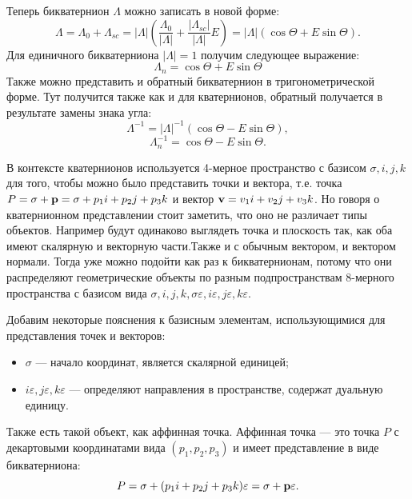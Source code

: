 Теперь бикватернион $\Lambda$ можно записать в новой форме:
\begin{equation*}
    \Lambda = \Lambda_0 + \Lambda_{sc} = |\Lambda| \left( \frac{\Lambda_0}{|\Lambda|} + \frac{|\Lambda_{sc}|}{|\Lambda|} E \right) = |\Lambda| (\cos\Theta + E \sin\Theta).
\end{equation*}
Для единичного бикватерниона $|\Lambda| = 1$ получим следующее выражение:
\begin{equation*}
    \Lambda_n = \cos\Theta + E \sin\Theta
\end{equation*}
Также можно представить и обратный бикватернион в тригонометрической форме. Тут получится также как и для кватернионов, обратный получается в результате замены знака угла:
\begin{equation*}
    \Lambda^{-1} = |\Lambda|^{-1} (\cos\Theta - E \sin\Theta),
\end{equation*}
\begin{equation*}
    \Lambda_n^{-1} = \cos\Theta - E \sin\Theta.
\end{equation*}

В контексте кватернионов используется 4-мерное пространство с базисом ${\sigma, i, j, k}$ для того, чтобы можно было представить точки и вектора, т.е. точка $P = \sigma + \vb{p} = \sigma + p_1 i + p_2 j + p_3 k$ и вектор $\vb{v} = v_1 i + v_2 j + v_3 k$. Но говоря о кватернионном представлении стоит заметить, что оно не различает типы объектов.
Например будут одинаково выглядеть точка и плоскость так, как оба имеют скалярную и векторную части.Также и с обычным вектором, и вектором нормали. Тогда уже можно подойти как раз к бикватернионам, потому что они распределяют геометрические объекты по разным подпространствам 8-мерного пространства с базисом вида ${\sigma, i, j, k, \sigma \varepsilon, i \varepsilon, j \varepsilon, k \varepsilon}$.

Добавим некоторые пояснения к базисным элементам, использующимися для представления точек и векторов:
\begin{itemize}
    \item $\sigma$ --- начало координат, является скалярной единицей;
    \item $i \varepsilon, j \varepsilon, k \varepsilon$ --- определяют направления в пространстве, содержат дуальную единицу.
\end{itemize}

Также есть такой объект, как аффинная точка. Аффинная точка --- это точка $P$ с декартовыми координатами вида $(p_1, p_2, p_3)$ и имеет представление в виде бикватерниона:
\begin{equation*}
    P = \sigma + (p_1 i + p_2 j + p_3 k) \varepsilon = \sigma + \vb{p} \varepsilon.
\end{equation*}

